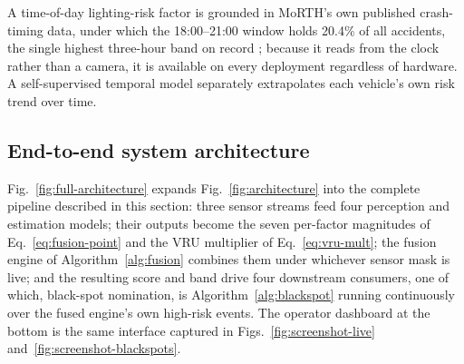\documentclass[journal]{IEEEtran}
\begin{document}
A time-of-day lighting-risk factor is grounded in MoRTH's own published crash-timing data, under which the 18:00--21:00 window holds 20.4\% of all accidents, the single highest three-hour band on record \cite{morth}; because it reads from the clock rather than a camera, it is available on every deployment regardless of hardware. A self-supervised temporal model separately extrapolates each vehicle's own risk trend over time.

\subsection{End-to-end system architecture}
\label{sec:full-architecture}

Fig.~\ref{fig:full-architecture} expands Fig.~\ref{fig:architecture} into the complete pipeline described in this section: three sensor streams feed four perception and estimation models; their outputs become the seven per-factor magnitudes of Eq.~\eqref{eq:fusion-point} and the VRU multiplier of Eq.~\eqref{eq:vru-mult}; the fusion engine of Algorithm~\ref{alg:fusion} combines them under whichever sensor mask is live; and the resulting score and band drive four downstream consumers, one of which, black-spot nomination, is Algorithm~\ref{alg:blackspot} running continuously over the fused engine's own high-risk events. The operator dashboard at the bottom is the same interface captured in Figs.~\ref{fig:screenshot-live} and~\ref{fig:screenshot-blackspots}.
\end{document}

